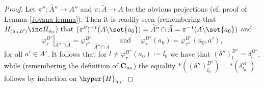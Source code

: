 \begin{proof}
Let $\pi'':\widetilde{A''}\rightarrow A''$ and $\pi:\tilde{A}\rightarrow A$ be the obvious projections (cf. proof of Lemma \ref{Jovana-lemma}). Then it is readily seen (remembering that $H_{(a_0,a')}\inc H_{a_0}$) that $(\pi'')^{-1}(A\backslash\set{a_0})= \widetilde{A''} \cap \tilde{A}= \pi^{-1}(A\backslash\set{a_0})$ and
\begin{equation}
\label{phi-phi-case1}
\varphi_\tau^{B''}|_{\widetilde{A''} \cap \tilde{A}}=\varphi_{\tau''}^{B''}|_{\widetilde{A''} \cap \tilde{A}}\quad \mbox{ and }\quad
\varphi_{\tau}^{B''}\!(a_0)=\varphi_{\tau''}^{B''}(a_0,a'), 
\end{equation}
for all $a'\in A'$. It follows that  for $l\neq \varphi_{\tau}^{B''}(a_0):=l_0$ we have that $(\delta'')^{B''}_l=\delta^{B''}_l$, while (remembering the definition of ${\bf C}_{a_0}$) the equality
$\ast((\delta'')^{B''}_{l_0})=\ast(\delta^{B''}_{l_0})$ follows by induction on $\hyper{H}_{a_0}$.


\end{proof}

